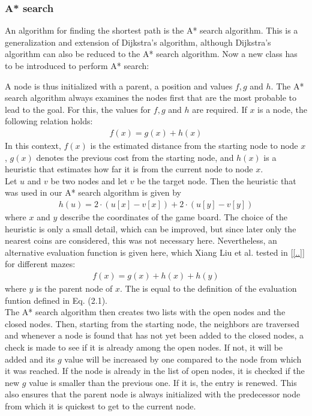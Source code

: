 \subsubsection*{A* search}
An algorithm for finding the shortest path is the A* search algorithm. This is a generalization and extension of Dijkstra's algorithm, although Dijkstra's algorithm can also be reduced to the A* search algorithm. Now a new class has to be introduced to perform A* search:
\vspace{0.1cm}

\vspace{0.1cm}
A node is thus initialized with a parent, a position and values $f,g$ and $h$. The A* search algorithm always examines the nodes first that are the most probable to lead to the goal. For this, the values for $f,g$ and $h$ are required. If $x$ is a node, the following relation holds:
\begin{align}
f(x) = g(x) + h(x)
\end{align}
In this context, $f(x)$ is the estimated distance from the starting node to node $x$, $g(x)$ denotes the previous cost from the starting node, and $h(x)$ is a heuristic that estimates how far it is from the current node to node $x$.
\\
 
Let $u$ and $v$ be two nodes and let $v$ be the target node. Then the heuristic that was used in our A* search algorithm is given by
\begin{align*}
h(u) = 2\cdot(u[x] - v[x]) + 2\cdot(u[y]-v[y])
\end{align*}
where $x$ and $y$ describe the coordinates of the game board. The choice of the heuristic is only a small detail, which can be improved, but since later only the nearest coins are considered, this was not necessary here. Nevertheless, an alternative evaluation function is given here, which Xiang Liu et al. tested in [\ref{..}] for different mazes:
\begin{align*}
f(x) = g(x)+h(x)+h(y)
\end{align*}
where $y$ is the parent node of $x$. The is equal to the definition of the evaluation funtion defined in Eq. (2.1).
\\

The A* search algorithm then creates two lists with the open nodes and the closed nodes. Then, starting from the starting node, the neighbors are traversed and whenever a node is found that has not yet been added to the closed nodes, a check is made to see if it is already among the open nodes. If not, it will be added and its $g$ value will be increased by one compared to the node from which it was reached. If the node is already in the list of open nodes, it is checked if the new $g$ value is smaller than the previous one. If it is, the entry is renewed. This also ensures that the parent node is always initialized with the predecessor node from which it is quickest to get to the current node.
\\

